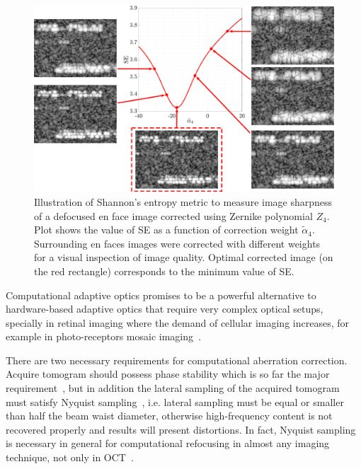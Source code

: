 \begin{figure}[htb!]
	\centering
	\includegraphics[width=\textwidth]{Figures/TheoreticalBasis/SharpnessCAO.pdf}
	\caption{Illustration of Shannon's entropy metric to measure image sharpness of a defocused en face image corrected using Zernike polynomial $Z_4$. Plot shows the value of SE as a function of correction weight $\tilde{\alpha}_4$. Surrounding en faces images were corrected with different weights for a visual inspection of image quality. Optimal corrected image (on the red rectangle) corresponds to the minimum value of SE.}
	\label{fig:Sharpness}
\end{figure}

Computational adaptive optics promises to be a powerful alternative to hardware-based adaptive optics that require very complex optical setups, specially in retinal imaging where the demand of cellular imaging increases, for example in photo-receptors mosaic imaging~\cite{Kumar2017_Invivo, Hillmann2016_Aberrationfree, South2018_Combined}.

There are two necessary requirements for computational aberration correction. Acquire tomogram should possess phase stability which is so far the major requirement~\cite{Shemonski2014_Stability, Liu2017_Computational, South2016_Computed}, but in addition the lateral sampling of the acquired tomogram must satisfy Nyquist sampling~\cite{Liu2017_Computational}, i.e. lateral sampling must be equal or smaller than half the beam waist diameter, otherwise high-frequency content is not recovered properly and results will present distortions. In fact, Nyquist sampling is necessary in general for computational refocusing in almost any imaging technique, not only in OCT~\cite{Wallace2001_Workingpersons, Pawley2006_Handbook, Biggs2010_3D}. 

